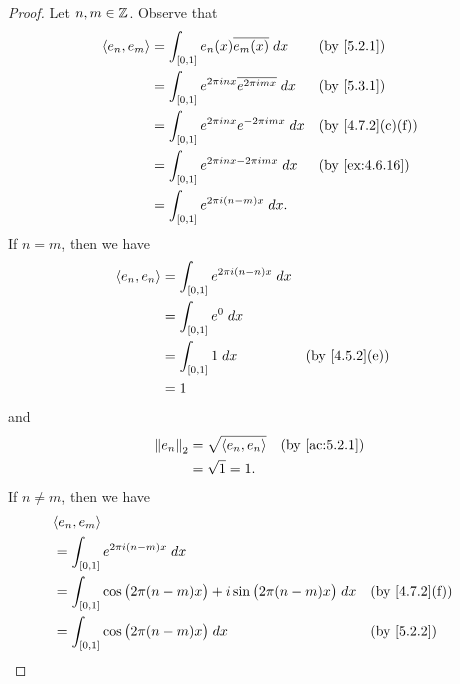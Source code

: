 \begin{proof}
  Let \(n, m \in \mathbb{Z}\).
  Observe that
  \begin{align*}
    \inner*{e_n, e_m} & = \int_{[0, 1]} e_n(x) \overline{e_m(x)} \; dx                   &  & \by{5.2.1}                     \\
                      & = \int_{[0, 1]} e^{2 \pi i n x} \overline{e^{2 \pi i m x}} \; dx &  & \by{5.3.1}                     \\
                      & = \int_{[0, 1]} e^{2 \pi i n x} e^{- 2 \pi i m x} \; dx          &  & \text{(by \cref{4.7.2}(c)(f))} \\
                      & = \int_{[0, 1]} e^{2 \pi i n x - 2 \pi i m x} \; dx              &  & \by{ex:4.6.16}                 \\
                      & = \int_{[0, 1]} e^{2 \pi i (n - m) x} \; dx.
  \end{align*}
  If \(n = m\), then we have
  \begin{align*}
    \inner*{e_n, e_n} & = \int_{[0, 1]} e^{2 \pi i (n - n) x} \; dx                                  \\
                      & = \int_{[0, 1]} e^0 \; dx                                                    \\
                      & = \int_{[0, 1]} 1 \; dx                     &  & \text{(by \cref{4.5.2}(e))} \\
                      & = 1
  \end{align*}
  and
  \begin{align*}
    \norm*{e_n}_2 & = \sqrt{\inner*{e_n, e_n}} &  & \by{ac:5.2.1} \\
                  & = \sqrt{1} = 1.
  \end{align*}
  If \(n \neq m\), then we have
  \begin{align*}
     & \inner*{e_n, e_m}                                                                                                                \\
     & = \int_{[0, 1]} e^{2 \pi i (n - m) x} \; dx                                                                                      \\
     & = \int_{[0, 1]} \cos\big(2 \pi (n - m) x\big) + i \sin\big(2 \pi (n - m) x\big) \; dx        &  & \text{(by \cref{4.7.2}(f))}    \\
     & = \int_{[0, 1]} \cos\big(2 \pi (n - m) x\big) \; dx                                          &  & \by{5.2.2}                     \\

\end{align*}
\end{proof}
